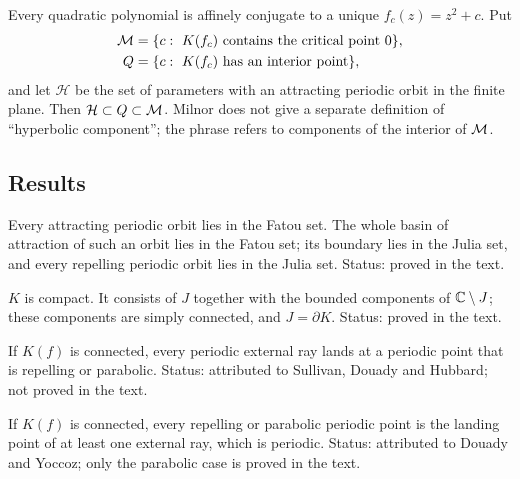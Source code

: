 \begin{definition}
\label{def:milnor-quadratic}
Every quadratic polynomial is affinely conjugate to a unique $f_c(z)=z^2+c$.  Put
\begin{align*}
 \mathcal M&=\{c:\ K(f_c)\text{ contains the critical point }0\},\\
 Q&=\{c:\ K(f_c)\text{ has an interior point}\},
\end{align*}
and let $\mathcal H$ be the set of parameters with an attracting periodic orbit in
the finite plane.  Then $\mathcal H\subset Q\subset\mathcal M$.  Milnor does not give a
separate definition of ``hyperbolic component''; the phrase refers to components
of the interior of $\mathcal M$.
\end{definition}

\subsection*{Results}

\begin{theorem}
\label{thm:milnor-3-3}
Every attracting periodic orbit lies in the Fatou set.  The whole basin of
attraction of such an orbit lies in the Fatou set; its boundary lies in the Julia
set, and every repelling periodic orbit lies in the Julia set.  Status: proved in
the text.
\end{theorem}

\begin{theorem}
\label{thm:milnor-17-1}
$K$ is compact.  It consists of $J$ together with the bounded components of
$\mathbb C\setminus J$; these components are simply connected, and $J=\partial K$.
Status: proved in the text.
\end{theorem}

\begin{theorem}
\label{thm:milnor-18-1}
If $K(f)$ is connected, every periodic external ray lands at a periodic point that
is repelling or parabolic.  Status: attributed to Sullivan, Douady and Hubbard; not
proved in the text.
\end{theorem}

\begin{theorem}
\label{thm:milnor-18-2}
If $K(f)$ is connected, every repelling or parabolic periodic point is the landing
point of at least one external ray, which is periodic.  Status: attributed to
Douady and Yoccoz; only the parabolic case is proved in the text.
\end{theorem}

